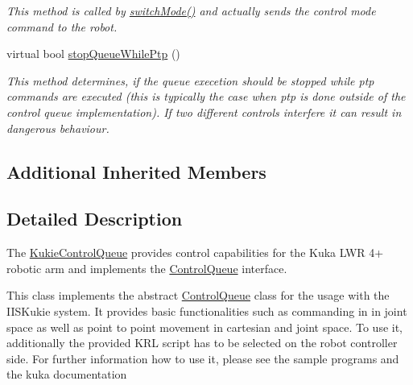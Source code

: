 \begin{DoxyCompactItemize}
\begin{DoxyCompactList}\small\item\em This method is called by \hyperlink{classkukadu_1_1ControlQueue_a5defe63d9f1b9829676f9a31a4683911}{switch\-Mode()} and actually sends the control mode command to the robot. \end{DoxyCompactList}\item 
virtual bool \hyperlink{classkukadu_1_1KukieControlQueue_abb6d8763fada53c6583b2a1ef58274ed}{stop\-Queue\-While\-Ptp} ()
\begin{DoxyCompactList}\small\item\em This method determines, if the queue execetion should be stopped while ptp commands are executed (this is typically the case when ptp is done outside of the control queue implementation). If two different controls interfere it can result in dangerous behaviour. \end{DoxyCompactList}\end{DoxyCompactItemize}
\subsection*{Additional Inherited Members}


\subsection{Detailed Description}
The \hyperlink{classkukadu_1_1KukieControlQueue}{Kukie\-Control\-Queue} provides control capabilities for the Kuka L\-W\-R 4+ robotic arm and implements the \hyperlink{classkukadu_1_1ControlQueue}{Control\-Queue} interface. 

This class implements the abstract \hyperlink{classkukadu_1_1ControlQueue}{Control\-Queue} class for the usage with the I\-I\-S\-Kukie system. It provides basic functionalities such as commanding in in joint space as well as point to point movement in cartesian and joint space. To use it, additionally the provided K\-R\-L script has to be selected on the robot controller side. For further information how to use it, please see the sample programs and the kuka documentation 

